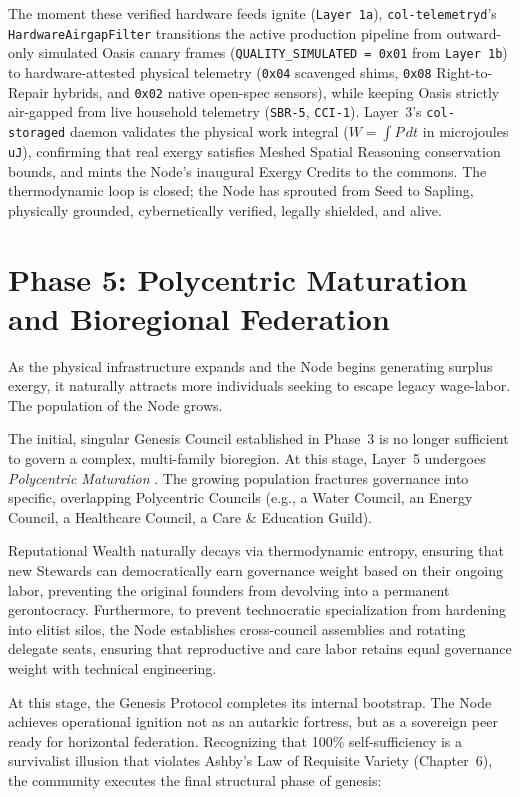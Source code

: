 The moment these verified hardware feeds ignite (\texttt{Layer 1a}), \texttt{col-telemetryd}'s \texttt{HardwareAirgapFilter} transitions the active production pipeline from outward-only simulated Oasis canary frames (\texttt{QUALITY\_SIMULATED = 0x01} from \texttt{Layer 1b}) to hardware-attested physical telemetry (\texttt{0x04} scavenged shims, \texttt{0x08} Right-to-Repair hybrids, and \texttt{0x02} native open-spec sensors), while keeping Oasis strictly air-gapped from live household telemetry (\texttt{SBR-5}, \texttt{CCI-1}). Layer~3's \texttt{col-storaged} daemon validates the physical work integral ($W = \int P\,dt$ in microjoules \texttt{uJ}), confirming that real exergy satisfies Meshed Spatial Reasoning conservation bounds, and mints the Node's inaugural Exergy Credits to the commons. The thermodynamic loop is closed; the Node has sprouted from Seed to Sapling, physically grounded, cybernetically verified, legally shielded, and alive.

\section[Phase 5: Polycentric Maturation]{Phase 5: Polycentric Maturation and Bioregional Federation}

As the physical infrastructure expands and the Node begins generating surplus exergy, it naturally attracts more individuals seeking to escape legacy wage-labor. The population of the Node grows. 

The initial, singular Genesis Council established in Phase~3 is no longer sufficient to govern a complex, multi-family bioregion. At this stage, Layer~5 undergoes \textit{Polycentric Maturation} \parencite{ostrom1990}. The growing population fractures governance into specific, overlapping Polycentric Councils (e.g., a Water Council, an Energy Council, a Healthcare Council, a Care \& Education Guild). 

Reputational Wealth naturally decays via thermodynamic entropy, ensuring that new Stewards can democratically earn governance weight based on their ongoing labor, preventing the original founders from devolving into a permanent gerontocracy. Furthermore, to prevent technocratic specialization from hardening into elitist silos, the Node establishes cross-council assemblies and rotating delegate seats, ensuring that reproductive and care labor retains equal governance weight with technical engineering.

At this stage, the Genesis Protocol completes its internal bootstrap. The Node achieves operational ignition not as an autarkic fortress, but as a sovereign peer ready for horizontal federation. Recognizing that 100\% self-sufficiency is a survivalist illusion that violates Ashby's Law of Requisite Variety (Chapter~6), the community executes the final structural phase of genesis:

